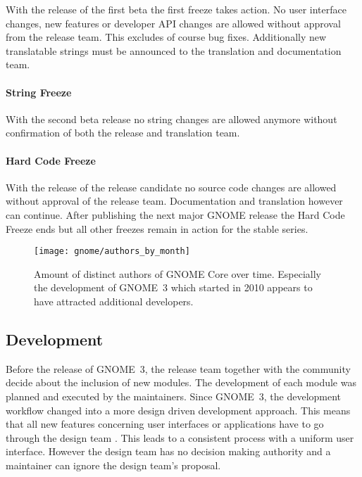 With the release of the first beta the first freeze takes action. No user
interface changes, new features or developer \ac{API} changes are allowed
without approval from the release team. This excludes of course bug fixes.
Additionally new translatable strings must be announced to the translation and
documentation team.

\paragraph{String Freeze}

With the second beta release no string changes are allowed anymore without
confirmation of both the release and translation team.

\paragraph{Hard Code Freeze}

With the release of the release candidate no source code changes are allowed
without approval of the release team. Documentation and translation however can
continue. After publishing the next major GNOME release the Hard Code Freeze
ends but all other freezes remain in action for the stable series.

\begin{figure}[htbp]
  \centering
  \texttt{[image: gnome/authors\_by\_month]}
  \caption[Authors by Month, GNOME]
  {Amount of distinct authors of GNOME Core over time. Especially the
    development of GNOME~3 which started in 2010 appears to have attracted
    additional developers.}
\end{figure}


\subsection{Development} %

Before the release of GNOME~3, the release team together with the community
decide about the inclusion of new modules. The development of each module was
planned and executed by the maintainers. Since GNOME~3, the development
workflow changed into a more design driven development approach. This means
that all new features concerning user interfaces or applications have to go
through the design team \cite{GNOMEDesignTeam}. This leads to a consistent
process with a uniform user interface. However the design team has no decision
making authority and a maintainer can ignore the design team's proposal.

